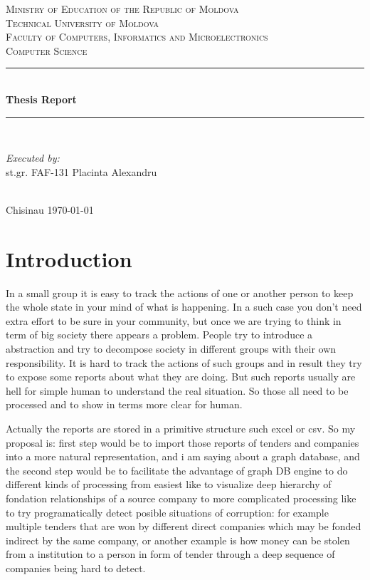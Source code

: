 \documentclass[12pt]{article}
\begin{document}
\begin{titlepage}
	\newcommand{\HRule}{\rule{\linewidth}{0.5mm}} 
	\center 
	\textsc{\Large Ministry of Education of the Republic of Moldova}\\[0.5cm] 
	\textsc{\Large Technical University of Moldova}\\[0.5cm]
	\textsc{\large Faculty of Computers, Informatics and Microelectronics}\\[0.5cm] 

	\textsc{\large Computer Science}\\[2cm] 
	\HRule \\[1.5cm]
	{ \Huge \bfseries Thesis Report}\\[0.5cm] 
	\HRule \\[9 cm]

	\begin{minipage}{\textwidth}
		\Large
		\emph{Executed by:}\\
		st.gr. FAF-131 \hfill Placinta Alexandru \bigskip
	\end{minipage}\\[2cm]

	{\large Chisinau \today}\\%
	\vfill 
\end{titlepage}

\pagebreak
\section*{Introduction}

	In a small group it is easy to track the actions of one or another person to keep the whole state in your mind of what is happening. In a such case you don't need extra effort to be sure in your community, but once we are trying to think in term of big society there appears a problem. People try to introduce a abstraction and try to decompose society in different groups with their own responsibility. It is hard to track the actions of such groups and in result they try to expose some reports about what they are doing. But such reports usually are hell for simple human to understand the real situation. So those all need to be processed and to show in terms more clear for human.
	
	
	Actually the reports are stored in a primitive structure such excel or csv. So my proposal is: first step would be to import those reports of tenders and companies into a more natural representation, and i am saying about a graph database, and the second step would be to facilitate the advantage of graph DB engine to do different kinds of processing from easiest like to visualize deep hierarchy of fondation relationships of a source company to more complicated processing like to try programatically detect posible situations of corruption: for example multiple tenders that are won by different direct companies which may be fonded indirect by the same company, or another example is how money can be stolen from a institution to a person in form of tender through a deep sequence of companies being hard to detect.
	
\end{document}
